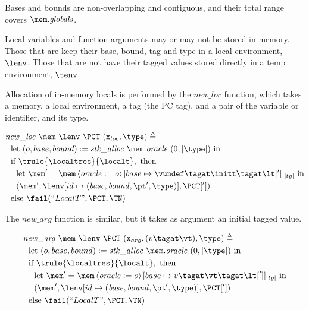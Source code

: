 \documentclass{article}
\begin{document}
Bases and bounds are non-overlapping and contiguous, and their total range covers
\(\mem.\mathit{globals}\).

Local variables and function arguments may or may not be stored in memory. Those
that are keep their base, bound, tag and type in a local environment, \(\lenv\).
Those that are not have their tagged values stored directly in a temp environment,
\(\tenv\).

Allocation of in-memory locals is performed by the \(\mathit{new\_loc}\) function,
which takes a memory, a local environment, a tag (the PC tag),
and a pair of the variable or identifier, and its type.

\[\begin{aligned}
& \mathit{new\_loc} ~ \mem ~ \lenv ~ \PCT ~ (\mathtt{x}_{loc}, \type) \triangleq \\
& ~~ \textnormal{let } (o,base,bound) := \mathit{stk\_alloc} ~ \mem.\mathit{oracle} ~ (0,|\type|) \textnormal{ in} \\
& ~~\textnormal{if } \trule{\localtres}{\localt}, \textnormal{ then} \\
& ~~~~ \textnormal{let } \mem' = \mem \left\langle \mathit{oracle} := o \right\rangle [base \mapsto \vundef\tagat\initt\tagat\lt[']]_{|ty|} \textnormal{ in} \\
& ~~~~ (\mem', \lenv[id \mapsto (\mathit{base, bound, \pt', \type})], \PCT[']) \\
& ~~ \textnormal{else } \fail(``LocalT",\PCT,\TN)
\end{aligned}\]

The \(\mathit{new\_arg}\) function is similar, but it takes as argument an initial tagged value.

\[\begin{aligned}
& \mathit{new\_arg} ~ \mem ~ \lenv ~ \PCT ~ (\mathtt{x}_{arg}, (v\tagat\vt), \type)\triangleq \\
& ~~ \textnormal{let } (o,base,bound) := \mathit{stk\_alloc} ~ \mem.\mathit{oracle} ~ (0,|\type|) \textnormal{ in} \\
& ~~\textnormal{if } \trule{\localtres}{\localt}, \textnormal{ then} \\
& ~~~~ \textnormal{let } \mem' = \mem \left\langle \mathit{oracle} := o \right\rangle [base \mapsto v\tagat\vt\tagat\lt[']]_{|ty|} \textnormal{ in} \\
& ~~~~ (\mem', \lenv[id \mapsto (\mathit{base, bound, \pt', \type})], \PCT[']) \\
& ~~ \textnormal{else } \fail(``LocalT",\PCT,\TN)
\end{aligned}\]
\end{document}
